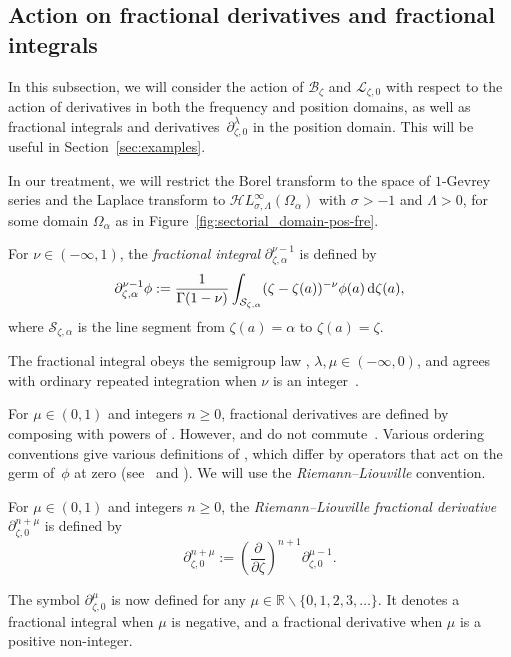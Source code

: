 \documentclass[10pt,a4paper]{amsart}
\newcommand{\singexp}[2]{\mathcal{H}L^\infty_{#1, #2}}
\newcommand{\R}{\mathbb{R}}
\newcommand{\fracderiv}[3]{\partial^{#1}_{#2, #3}}
\newcommand{\laplace}{\mathcal{L}}
\newcommand{\borel}{\mathcal{B}}
\numberwithin{equation}{section}
\begin{document}
\subsection{Action on fractional derivatives and fractional integrals}\label{sec:frac-diff-laplace}
In this subsection, we will consider the action of $\borel_\zeta$ and $\laplace_{\zeta,0}$ with respect to the action of derivatives in both the frequency and position domains, as well as fractional integrals and derivatives~$\fracderiv{\lambda}{\zeta}{0}$ in the position domain. This will be useful in Section~\ref{sec:examples}.

In our treatment, we will restrict the Borel transform to the space of $1$-Gevrey series and the Laplace transform to $\singexp{\sigma}{\Lambda}(\Omega_\alpha)$ with $\sigma>-1$ and $\Lambda>0$, for some domain $\Omega_\alpha$ as in Figure~\ref{fig:sectorial_domain-pos-fre}.
\begin{Definition}
For $\nu \in (-\infty, 1)$, the \textit{fractional integral} $\partial^{\nu-1}_{\zeta, \alpha}$ is defined by
\[ \partial^{\nu-1}_{\zeta, \alpha} \phi := \frac{1}{\Gamma(1-\nu)} \int_{\mathcal{S}_{\zeta,\alpha}} (\zeta-\zeta(a))^{-\nu} \phi(a) \,{\rm d}\zeta(a), \]
where $\mathcal{S}_{\zeta,\alpha}$ is the line segment from $\zeta(a)=\alpha$ to $\zeta(a)=\zeta$.
\end{Definition}
The fractional integral obeys the semigroup law \cite[Section~1.3]{mladenov2014advanced}
\smash{$
\fracderiv{\lambda}{\zeta}{\alpha} \fracderiv{\mu}{\zeta}{\alpha} = \fracderiv{\lambda+\mu}{\zeta}{\alpha} $}, $ \lambda, \mu \in (-\infty, 0)$,
and agrees with ordinary repeated integration when $\nu$ is an integer~\cite[equation~(35)]{mladenov2014advanced}.

For $\mu \in (0, 1)$ and integers $n \ge 0$, fractional derivatives \smash{$\fracderiv{n+\mu}{\zeta}{0}$} are defined by composing \smash{$\fracderiv{\mu-1}{\zeta}{0}$} with powers of \smash{$\frac{\partial}{\partial \zeta}$}. However, \smash{$\fracderiv{\mu-1}{\zeta}{0}$} and \smash{$\frac{\partial}{\partial \zeta}$} do not commute~\cite[equation~(54)]{mladenov2014advanced}. Various ordering conventions give various definitions of \smash{$\fracderiv{n+\mu}{\zeta}{0} \phi$}, which differ by operators that act on the germ of~$\phi$ at zero (see~\cite[Section 1.3]{mladenov2014advanced} and \cite{podlubny}). We will use the {\em Riemann--Liouville} convention.

\begin{Definition}\label{definition:frac_driv}
For $\mu \in (0, 1)$ and integers $n \ge 0$, the {\em Riemann--Liouville fractional derivative}~$\fracderiv{n+\mu}{\zeta}{0}$ is defined by
\[ \fracderiv{n+\mu}{\zeta}{0} := \left(\frac{\partial}{\partial \zeta}\right)^{n+1} \fracderiv{\mu-1}{\zeta}{0}. \]
\end{Definition}
The symbol $\fracderiv{\mu}{\zeta}{0}$ is now defined for any $\mu \in \R \smallsetminus \{0, 1, 2, 3, \dots\}$. It denotes a fractional integral when $\mu$ is negative, and a fractional derivative when $\mu$ is a positive non-integer.
\end{document}
